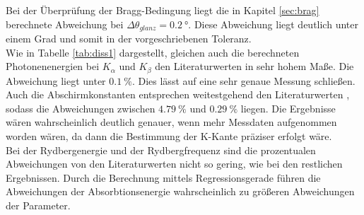 Bei der Überprüfung der Bragg-Bedingung liegt die in Kapitel \ref{sec:brag} berechnete Abweichung bei $\Delta\theta_{glanz}=\SI{0.2}{\degree}$.
Diese Abweichung liegt deutlich unter einem Grad und somit in der vorgeschriebenen Toleranz.
\\\noindent
Wie in Tabelle \ref{tab:diss1} dargestellt, gleichen auch die berechneten Photonenenergien bei $K_\alpha$ und $K_\beta$
den Literaturwerten in sehr hohem Maße. Die Abweichung liegt unter $\SI{0.1}{\percent}$. Dies lässt auf eine sehr genaue Messung schließen.
\\\noindent
Auch die Abschirmkonstanten entsprechen weitestgehend den Literaturwerten \cite{AP05}, sodass die Abweichungen zwischen $\SI{4.79}{\percent}$
und $\SI{0.29}{\percent}$ liegen. Die Ergebnisse wären wahrscheinlich deutlich genauer, wenn mehr Messdaten aufgenommen worden wären, da
dann die Bestimmung der K-Kante präziser erfolgt wäre.
\\\noindent
Bei der Rydbergenergie und der Rydbergfrequenz sind die prozentualen Abweichungen von den Literaturwerten \cite{AP06} nicht so gering, wie bei
den restlichen Ergebnissen. Durch die Berechnung mittels Regressionsgerade führen die Abweichungen der Absorbtionsenergie wahrscheinlich
zu größeren Abweichungen der Parameter.
